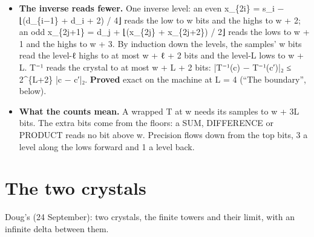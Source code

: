 \begin{itemize}
\begin{itemize}
\item Upper bound: a level reads the lows below it to 3 bits more, by the table.
\item Exact on the outermost sample of an interior cone. Of the level-(ℓ − 1) lows the cone reads, that sample reaches only the outermost, as its outer even. Adding 2\textasciicircum{}\{m+2\} to an outer even moves the low above by exactly −2\textasciicircum{}\{m−1\} for m ≥ 1. Adding 2\textasciicircum{}\{w+3L−1\} to the sample moves the outermost level-1 low of the cone by 2\textasciicircum{}\{w+3L−4\} in magnitude, the level-2 low by 2\textasciicircum{}\{w+3L−7\}, and the level-L low by 2\textasciicircum{}\{w−1\}.
\item As a 2-adic modulus: |T(x) − T(y)|₂ ≤ 2\textasciicircum{}\{3L\} |x − y|₂ along one line.
\item \textbf{Proved} on the machine, the bound and its exactness, per band: 3ℓ at the level-ℓ lows and 3ℓ − 2 at the level-ℓ highs (“The boundary”, below).
\end{itemize}
\item \textbf{The inverse reads fewer.} One inverse level: an even x\_\allowbreak{}\{2i\} = s\_\allowbreak{}i − ⌊(d\_\allowbreak{}\{i−1\} + d\_\allowbreak{}i + 2) / 4⌋ reads the low to w bits and the highs to w + 2; an odd x\_\allowbreak{}\{2j+1\} = d\_\allowbreak{}j + ⌊(x\_\allowbreak{}\{2j\} + x\_\allowbreak{}\{2j+2\}) / 2⌋ reads the lows to w + 1 and the highs to w + 3. By induction down the levels, the samples' w bits read the level-ℓ highs to at most w + ℓ + 2 bits and the level-L lows to w + L. T⁻¹ reads the crystal to at most w + L + 2 bits: |T⁻¹(c) − T⁻¹(c′)|₂ ≤ 2\textasciicircum{}\{L+2\} |c − c′|₂. \textbf{Proved} exact on the machine at L = 4 (“The boundary”, below).
\item \textbf{What the counts mean.} A wrapped T at w needs its samples to w + 3L bits. The extra bits come from the floors: a SUM, DIFFERENCE or PRODUCT reads no bit above w. Precision flows down from the top bits, 3 a level along the lows forward and 1 a level back.
\end{itemize}

\section{\texorpdfstring{The two crystals}{The two crystals}}

Doug's (24 September): two crystals, the finite towers and their limit, with an infinite delta between them.

